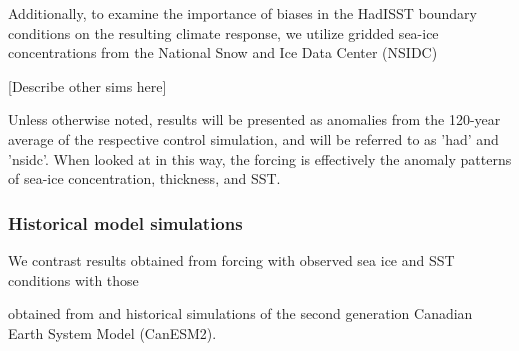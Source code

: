\documentclass[twocol]{ametsoc}
\begin{document}

Additionally, to examine the importance of biases in the HadISST boundary conditions on the resulting climate response, we utilize gridded sea-ice concentrations from the National Snow and Ice Data Center (NSIDC)

[Describe other sims here]

Unless otherwise noted, results will be presented as anomalies from the 120-year average of the respective control simulation, and will be referred to as 'had' and 'nsidc'. When looked at in this way, the forcing is effectively the anomaly patterns of sea-ice concentration, thickness, and SST. 
 
\subsubsection{Historical model simulations}

 We contrast results obtained from forcing with observed sea ice and SST conditions with those 

 obtained from  and historical simulations of the second generation Canadian Earth System Model (CanESM2).
\end{document}

